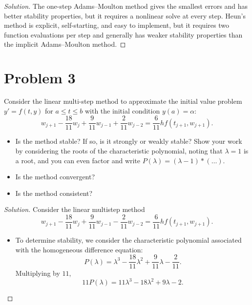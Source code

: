\documentclass[12pt]{amsart}
\newenvironment{solution}
{\begin{proof}[Solution]}
{\end{proof}}
\begin{document}
\begin{onehalfspace}
\begin{solution}
            The one-step Adams--Moulton method gives the smallest errors
            and has better stability properties, but it requires a
            nonlinear solve at every step. Heun's method is explicit,
            self-starting, and easy to implement, but it requires two
            function evaluations per step and generally has weaker
            stability properties than the implicit Adams--Moulton
            method.
        \end{solution}

        \section{Problem 3}
        Consider the linear multi-step method to approximate the initial value problem $y'=f(t,y)$ for $a\le t\le b$
        with the initial condition $y(a)=\alpha$:
        \[
            w_{j+1} - \frac{18}{11}w_j + \frac{9}{11}w_{j-1} + \frac{2}{11}w_{j-2} = \frac{6}{11}h f(t_{j+1}, w_{j+1}).
        \]
        \begin{itemize}
            \item[(a)] Is the method stable?
            If so, is it strongly or weakly stable?
            Show your work by considering the roots of the characteristic polynomial, noting that $\lambda=1$ is a root,
            and you can even factor and write $P(\lambda) = (\lambda - 1)*(\ldots)$.
            \item[(b)] Is the method convergent?
            \item[(c)] Is the method consistent?
        \end{itemize}

        \begin{solution}
            Consider the linear multistep method
            \[
                w_{j+1}
                -\frac{18}{11}w_j
                +\frac{9}{11}w_{j-1}
                -\frac{2}{11}w_{j-2}
                =
                \frac{6}{11}h f(t_{j+1},w_{j+1}).
            \]

            \begin{itemize}

                \item[(a)] To determine stability, we consider the characteristic
                polynomial associated with the homogeneous difference equation:
                \[
                    P(\lambda)
                    =
                    \lambda^3
                    -\frac{18}{11}\lambda^2
                    +\frac{9}{11}\lambda
                    -\frac{2}{11}.
                \]
                Multiplying by \(11\),
                \[
                    11P(\lambda)
                    =
                    11\lambda^3-18\lambda^2+9\lambda-2.
                \]


\end{itemize}
\end{solution}
\end{onehalfspace}
\end{document}
